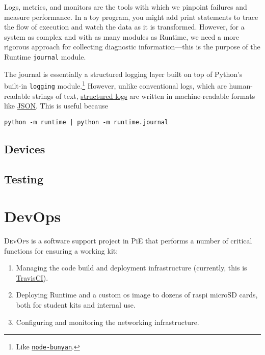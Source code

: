\documentclass[12pt]{book}
\begin{document}
  Logs, metrics, and monitors are the tools with which we pinpoint failures and measure performance.
  In a toy program, you might add print statements to trace the flow of execution and watch the data as it is transformed.
  However, for a system as complex and with as many modules as Runtime, we need a more rigorous approach for collecting diagnostic information---this is the purpose of the Runtime \texttt{journal} module.

  The journal is essentially a structured logging layer built on top of Python's built-in \texttt{logging} module.\footnote{Like \href{https://github.com/trentm/node-bunyan}{\texttt{node-bunyan}}.}
  However, unlike conventional logs, which are human-readable strings of text, \href{https://stackify.com/what-is-structured-logging-and-why-developers-need-it/}{structured logs} are written in machine-readable formats like \href{https://www.json.org/}{JSON}.
  This is useful because

  \begin{lstlisting}[gobble=4]
    python -m runtime | python -m runtime.journal
  \end{lstlisting}

  \section{Devices}

  \section{Testing}

  \chapter{DevOps}

  \textsc{DevOps} is a software support project in PiE that performs a number of critical functions for ensuring a working kit:
  \begin{enumerate}
    \item Managing the code build and deployment infrastructure (currently, this is \href{https://travis-ci.org/pioneers/PieCentral}{TravisCI}).
    \item Deploying Runtime and a custom \gls{os} \gls{image} to dozens of \gls{raspi} microSD cards, both for student kits and internal use.
    \item Configuring and monitoring the networking infrastructure.
  \end{enumerate}
\end{document}

